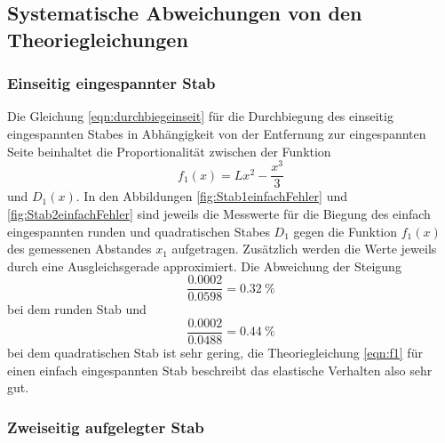 \subsection{Systematische Abweichungen von den Theoriegleichungen}

\subsubsection{Einseitig eingespannter Stab}

Die Gleichung \eqref{eqn:durchbiegeinseit} für die Durchbiegung des einseitig
eingespannten Stabes in Abhängigkeit von der Entfernung zur eingespannten
Seite beinhaltet die Proportionalität zwischen der Funktion
\begin{equation}
  f_1(x) = Lx^2 - \frac{x^3}{3}
  \label{eqn:f1}
\end{equation}
und $D_1(x)$. In den Abbildungen \ref{fig:Stab1einfachFehler} und
\ref{fig:Stab2einfachFehler} sind jeweils die
Messwerte für die Biegung des einfach eingespannten runden und quadratischen
Stabes $D_1$ gegen die Funktion $f_1(x)$ des gemessenen Abstandes $x_1$
aufgetragen. Zusätzlich werden die Werte jeweils durch eine Ausgleichsgerade
approximiert. Die Abweichung der Steigung
\begin{equation}
  \frac{0.0002}{0.0598} = \SI{0.32}{\percent}
\end{equation}
bei dem runden Stab und
\begin{equation}
  \frac{0.0002}{0.0488} = \SI{0.44}{\percent}
\end{equation}
bei dem quadratischen Stab ist sehr gering, die Theoriegleichung \eqref{eqn:f1}
für einen einfach eingespannten Stab beschreibt das elastische Verhalten
also sehr gut.

\subsubsection{Zweiseitig aufgelegter Stab}
\label{sec:SysAbwDoppAuf}

